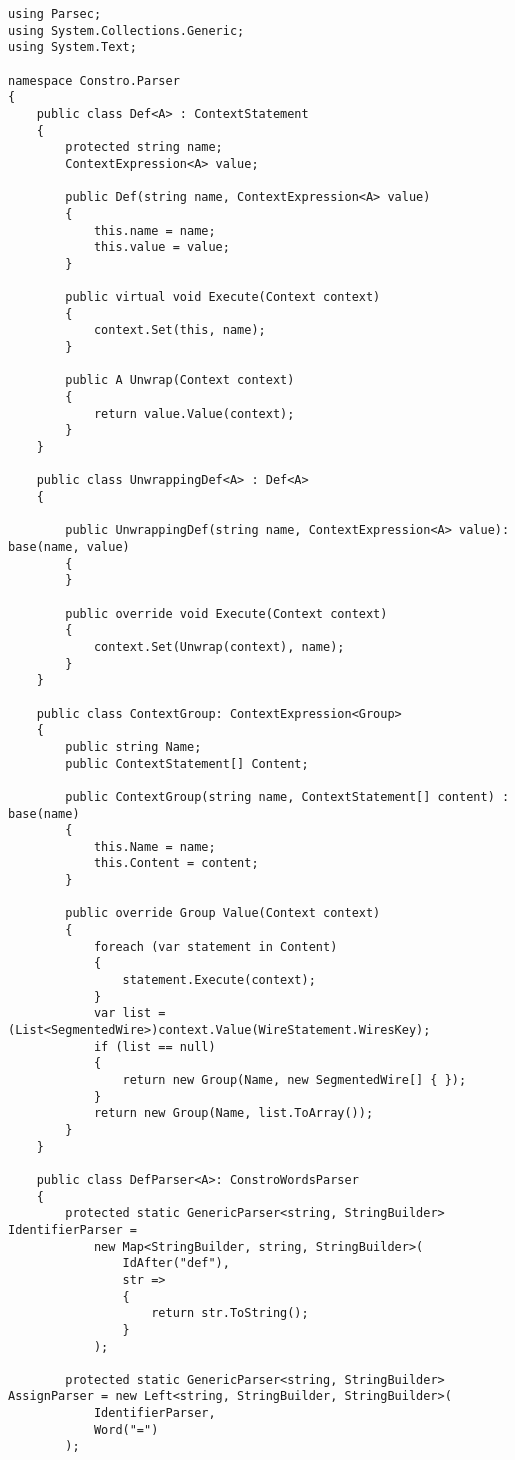 \documentclass{scrartcl}
\begin{document}
\begin{lstlisting}[language={[Sharp]C}, caption={Def}, label={experiment}]
using Parsec;
using System.Collections.Generic;
using System.Text;

namespace Constro.Parser
{
    public class Def<A> : ContextStatement
    {
        protected string name;
        ContextExpression<A> value;

        public Def(string name, ContextExpression<A> value)
        {
            this.name = name;
            this.value = value;
        }

        public virtual void Execute(Context context)
        {
            context.Set(this, name);
        }

        public A Unwrap(Context context)
        {
            return value.Value(context);
        }
    }

    public class UnwrappingDef<A> : Def<A>
    {

        public UnwrappingDef(string name, ContextExpression<A> value): base(name, value)
        {
        }

        public override void Execute(Context context)
        {
            context.Set(Unwrap(context), name);
        }
    }

    public class ContextGroup: ContextExpression<Group>
    {
        public string Name;
        public ContextStatement[] Content;

        public ContextGroup(string name, ContextStatement[] content) : base(name)
        {
            this.Name = name;
            this.Content = content;
        }

        public override Group Value(Context context)
        {
            foreach (var statement in Content)
            {
                statement.Execute(context);
            }
            var list = (List<SegmentedWire>)context.Value(WireStatement.WiresKey);
            if (list == null)
            {
                return new Group(Name, new SegmentedWire[] { });
            }
            return new Group(Name, list.ToArray());
        }
    }

    public class DefParser<A>: ConstroWordsParser
    {
        protected static GenericParser<string, StringBuilder> IdentifierParser =
            new Map<StringBuilder, string, StringBuilder>(
                IdAfter("def"),
                str =>
                {
                    return str.ToString();
                }
            );

        protected static GenericParser<string, StringBuilder> AssignParser = new Left<string, StringBuilder, StringBuilder>(
            IdentifierParser,
            Word("=")
        );


\end{lstlisting}
\end{document}
